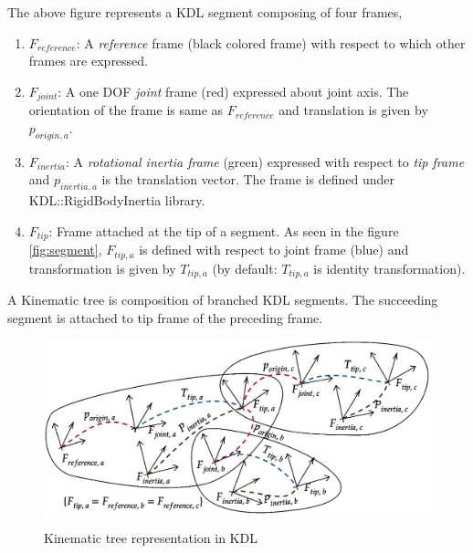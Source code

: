 The above figure represents a KDL segment composing of four frames,
\begin{enumerate}
	\item $F_{reference}$: A \textit{reference} frame (black colored frame) with respect to which other frames are expressed.
	\item $F_{joint}$: A one DOF \textit{joint} frame (red) expressed about joint axis. The orientation of the frame is same as $F_{reference}$ and translation is given by $p_{origin, a}$.
	\item $F_{inertia}$: A \textit{rotational inertia frame} (green) expressed with respect to \textit{tip frame} and $p_{inertia, a}$ is the translation vector. The frame is defined under KDL::RigidBodyInertia library.
	\item $F_{tip}$: Frame attached at the tip of a segment. As seen in the figure \ref{fig:segment}, $F_{tip, a}$ is defined with respect to joint frame (blue) and transformation is given by $T_{tip, a}$ (by default: $T_{tip, a}$ is identity transformation). 
\end{enumerate}

A Kinematic tree is composition of branched KDL segments. The succeeding segment is attached to tip frame of the preceding frame.

\begin{figure}[h!]
	\label{fig:kinematic-tree}
	\begin{center}
		\includegraphics[scale=0.3]{images/kinematic-tree}
	\end{center}
	\caption{Kinematic tree representation in KDL}
\end{figure}